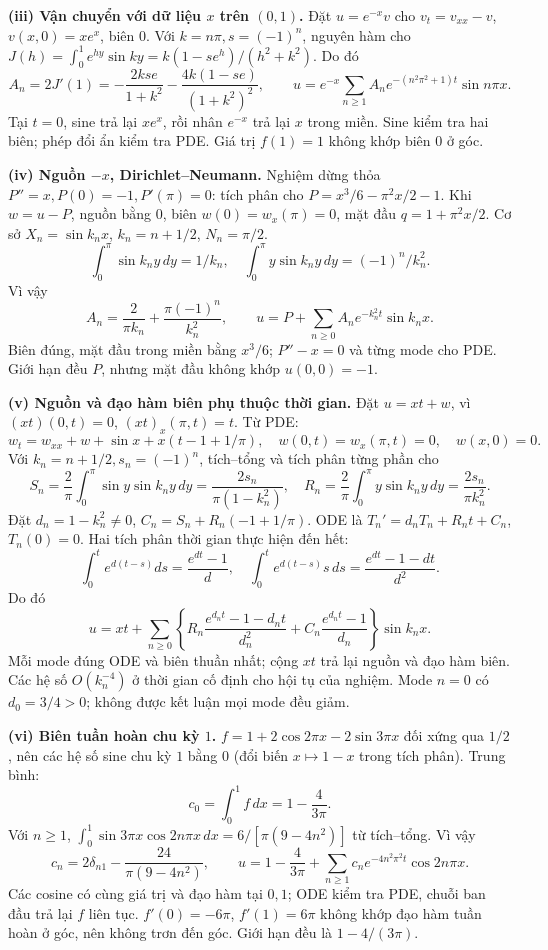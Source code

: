 \textbf{(iii) Vận chuyển với dữ liệu $x$ trên $(0,1)$.}
Đặt $u=e^{-x}v$ cho $v_t=v_{xx}-v$, $v(x,0)=xe^x$, biên $0$. Với $k=n\pi,s=(-1)^n$, nguyên hàm cho $J(h)=\int_0^1e^{hy}\sin ky=k(1-se^h)/(h^2+k^2)$. Do đó
\[A_n=2J'(1)=-\frac{2kse}{1+k^2}-\frac{4k(1-se)}{(1+k^2)^2},\qquad
u=e^{-x}\sum_{n\ge1}A_ne^{-(n^2\pi^2+1)t}\sin n\pi x.\]
Tại $t=0$, sine trả lại $xe^x$, rồi nhân $e^{-x}$ trả lại $x$ trong miền. Sine kiểm tra hai biên; phép đổi ẩn kiểm tra PDE. Giá trị $f(1)=1$ không khớp biên $0$ ở góc.

\textbf{(iv) Nguồn $-x$, Dirichlet–Neumann.}
Nghiệm dừng thỏa $P''=x,P(0)=-1,P'(\pi)=0$: tích phân cho $P=x^3/6-\pi^2x/2-1$. Khi $w=u-P$, nguồn bằng $0$, biên $w(0)=w_x(\pi)=0$, mặt đầu $q=1+\pi^2x/2$. Cơ sở $X_n=\sin k_nx$, $k_n=n+1/2$, $N_n=\pi/2$.
\[\int_0^\pi\sin k_ny\,dy=1/k_n,\quad
\int_0^\pi y\sin k_ny\,dy=(-1)^n/k_n^2.\]
Vì vậy
\[A_n=\frac2{\pi k_n}+\frac{\pi(-1)^n}{k_n^2},\qquad
u=P+\sum_{n\ge0}A_ne^{-k_n^2t}\sin k_nx.\]
Biên đúng, mặt đầu trong miền bằng $x^3/6$; $P''-x=0$ và từng mode cho PDE. Giới hạn đều $P$, nhưng mặt đầu không khớp $u(0,0)=-1$.

\textbf{(v) Nguồn và đạo hàm biên phụ thuộc thời gian.}
Đặt $u=xt+w$, vì $(xt)(0,t)=0$, $(xt)_x(\pi,t)=t$. Từ PDE:
\[w_t=w_{xx}+w+\sin x+x(t-1+1/\pi),\quad
w(0,t)=w_x(\pi,t)=0,\quad w(x,0)=0.\]
Với $k_n=n+1/2,s_n=(-1)^n$, tích–tổng và tích phân từng phần cho
\[S_n=\frac2\pi\int_0^\pi\sin y\sin k_ny\,dy
=\frac{2s_n}{\pi(1-k_n^2)},\quad
R_n=\frac2\pi\int_0^\pi y\sin k_ny\,dy=\frac{2s_n}{\pi k_n^2}.\]
Đặt $d_n=1-k_n^2\ne0$, $C_n=S_n+R_n(-1+1/\pi)$. ODE là $T_n'=d_nT_n+R_nt+C_n$, $T_n(0)=0$. Hai tích phân thời gian thực hiện đến hết:
\[\int_0^te^{d(t-s)}ds=\frac{e^{dt}-1}d,\quad
\int_0^te^{d(t-s)}s\,ds=\frac{e^{dt}-1-dt}{d^2}.\]
Do đó
\[u=xt+\sum_{n\ge0}\left\{
R_n\frac{e^{d_nt}-1-d_nt}{d_n^2}
+C_n\frac{e^{d_nt}-1}{d_n}\right\}\sin k_nx.\]
Mỗi mode đúng ODE và biên thuần nhất; cộng $xt$ trả lại nguồn và đạo hàm biên. Các hệ số $O(k_n^{-4})$ ở thời gian cố định cho hội tụ của nghiệm. Mode $n=0$ có $d_0=3/4>0$; không được kết luận mọi mode đều giảm.

\textbf{(vi) Biên tuần hoàn chu kỳ $1$.}
$f=1+2\cos2\pi x-2\sin3\pi x$ đối xứng qua $1/2$, nên các hệ số sine chu kỳ $1$ bằng $0$ (đổi biến $x\mapsto1-x$ trong tích phân). Trung bình:
\[c_0=\int_0^1f\,dx=1-\frac4{3\pi}.\]
Với $n\ge1$, $\int_0^1\sin3\pi x\cos2n\pi x\,dx=6/[\pi(9-4n^2)]$ từ tích–tổng. Vì vậy
\[c_n=2\delta_{n1}-\frac{24}{\pi(9-4n^2)},\qquad
u=1-\frac4{3\pi}+\sum_{n\ge1}c_ne^{-4n^2\pi^2t}\cos2n\pi x.\]
Các cosine có cùng giá trị và đạo hàm tại $0,1$; ODE kiểm tra PDE, chuỗi ban đầu trả lại $f$ liên tục. $f'(0)=-6\pi$, $f'(1)=6\pi$ không khớp đạo hàm tuần hoàn ở góc, nên không trơn đến góc. Giới hạn đều là $1-4/(3\pi)$.

